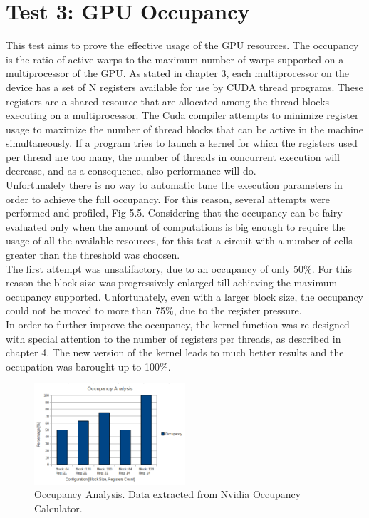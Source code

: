 \section{Test 3: GPU Occupancy}
This test aims to prove the effective usage of the GPU resources. The occupancy is the ratio of active warps to the maximum number of warps supported on a multiprocessor of the GPU. As stated in chapter 3, each multiprocessor on the device has a set of N registers available for use by CUDA thread programs. These registers are a shared resource that are allocated among the thread blocks executing on a multiprocessor. The Cuda compiler attempts to minimize register usage to maximize the number of thread blocks that can be active in the machine simultaneously. If a program tries to launch a kernel for which the registers used per thread are too many, the number of threads in concurrent execution will decrease, and as a consequence, also performance will do.\\
Unfortunalely there is no way to automatic tune the execution parameters in order to achieve the full occupancy. For this reason, several attempts were performed and profiled, Fig 5.5. Considering that the occupancy can be fairy evaluated only when the amount of computations is big enough to require the usage of all the available resources, for this test a circuit with a number of cells greater than the threshold was choosen.\\ 
The first attempt was unsatifactory, due to an occupancy of only 50\%. For this reason the block size was progressively enlarged till achieving the maximum occupancy supported. Unfortunately, even with a larger block size, the occupancy could not be moved to more than 75\%, due to the register pressure.\\
In order to further improve the occupancy, the kernel function was re-designed with special attention to the number of registers per threads, as described in chapter 4. The new version of the kernel leads to much better results and the occupation was barought up to 100\%.
    
\begin{figure}[h!bt]
        \centerline{\includegraphics[width=0.5\textwidth]{img/OccupancyAnalysis.png}}
        \caption{Occupancy Analysis. Data extracted from Nvidia Occupancy Calculator.}
        \label{fig:OccupancyAnalysis}
\end{figure}

